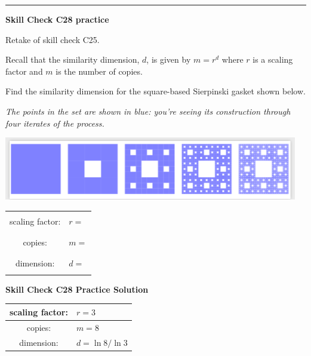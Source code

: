 \documentclass[12pt,letterpaper,noanswers]{exam}
\begin{document}
\vspace{0.2cm}
\hrule
\vspace{0.2cm}

\noindent\textbf{Skill Check C28 practice}
\begin{questions}
\item Retake of skill check C25.

\item Recall that the similarity dimension, $d$, is given by $m = r^d$ where $r$ is a scaling factor and $m$ is the number of copies.

Find the similarity dimension for the square-based Sierpinski gasket shown below.  

\emph{The points in the set are shown in blue: you're seeing its construction through four iterates of the process.}


\includegraphics[width=\textwidth]{img/C29-2019-11-13p2.png}


\begin{tabular}{|c|p{3cm}|}
\hline
& \\
scaling factor: & $r =$ \\
& \\
\hline
& \\
copies: & $m=$ \\
& \\
\hline
& \\
dimension: & $d=$ \\
& \\
\hline
\end{tabular}

\end{questions}

\noindent\textbf{Skill Check C28 Practice Solution}

\vspace{0.1cm}

\begin{tabular}{|c|p{3cm}|}
\hline
scaling factor: & $r = 3$ \\
\hline
copies: & $m=8$ \\
\hline
dimension: & $d=\ln 8/\ln 3$ \\
\hline
\end{tabular}
\end{document}
